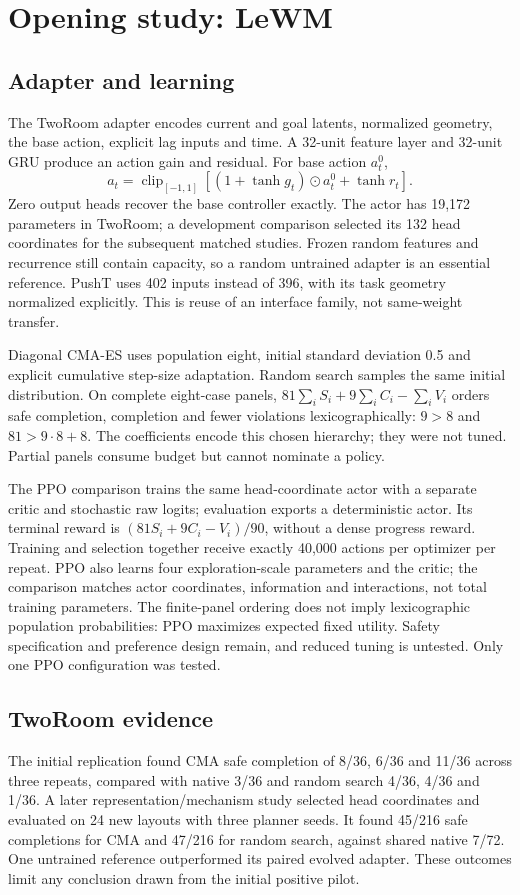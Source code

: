 \documentclass[sigconf,nonacm]{acmart}
\begin{document}
\section{Opening study: LeWM}
\subsection{Adapter and learning}
The TwoRoom adapter encodes current and goal latents, normalized geometry, the base
action, explicit lag inputs and time. A 32-unit feature layer and 32-unit GRU produce
an action gain and residual. For base action $a_t^0$,
\begin{equation}
a_t=\operatorname{clip}_{[-1,1]}\left[
(1+\tanh g_t)\odot a_t^0+\tanh r_t\right].
\end{equation}
Zero output heads recover the base controller exactly. The actor has 19,172
parameters in TwoRoom; a development comparison selected its 132 head coordinates
for the subsequent matched studies. Frozen random features and recurrence still
contain capacity, so a random untrained adapter is an essential reference.
PushT uses 402 inputs instead of 396, with its task geometry normalized explicitly.
This is reuse of an interface family, not same-weight transfer.

Diagonal CMA-ES uses population eight, initial standard deviation 0.5 and explicit
cumulative step-size adaptation. Random search samples the same initial distribution.
On complete eight-case panels, $81\sum_i S_i+9\sum_i C_i-\sum_i V_i$ orders safe
completion, completion and fewer violations lexicographically: $9>8$ and
$81>9\cdot8+8$. The coefficients encode this chosen hierarchy; they were not tuned.
Partial panels consume budget but cannot nominate a policy.

The PPO comparison trains the same head-coordinate actor with a separate critic
and stochastic raw logits; evaluation exports a deterministic actor. Its terminal
reward is $(81S_i+9C_i-V_i)/90$, without a dense progress reward. Training and
selection together receive exactly 40,000 actions per optimizer per repeat.
PPO also learns four exploration-scale parameters and the critic; the comparison
matches actor coordinates, information and interactions, not total training parameters.
The finite-panel ordering does not imply lexicographic population probabilities:
PPO maximizes expected fixed utility. Safety specification and preference design
remain, and reduced tuning is untested. Only one PPO configuration was tested.

\subsection{TwoRoom evidence}
The initial replication found CMA safe completion of 8/36, 6/36 and 11/36 across
three repeats, compared with native 3/36 and random search 4/36, 4/36 and 1/36.
A later representation/mechanism study selected head coordinates and evaluated on
24 new layouts with three planner seeds. It found 45/216 safe completions for CMA
and 47/216 for random search, against shared native 7/72. One untrained reference
outperformed its paired evolved adapter. These outcomes limit any conclusion drawn
from the initial positive pilot.
\end{document}
